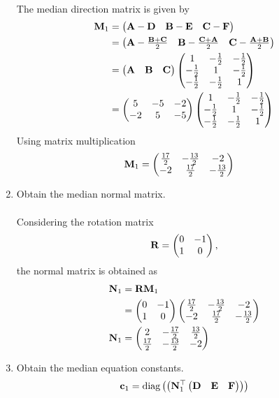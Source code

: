 \documentclass[10pt]{book}
\begin{document}
\begin{enumerate}[label=\thesubsection.\arabic*.,ref=\thesubsection.\theenumi]
\solution \\
The median direction matrix is given by 
\begin{align}
			\mathbf{M}_1 &= \begin{pmatrix}\mathbf{A}-\mathbf{D} & \mathbf{B}-\mathbf{E} & \mathbf{C}-\mathbf{F}\end{pmatrix}
			\\
			&= 
			  \begin{pmatrix}
				  \mathbf{A}-\frac{\mathbf{B}+\mathbf{C}}{2} &
			  \mathbf{B}-\frac{\mathbf{C}+\mathbf{A}}{2} &
			  \mathbf{C}-\frac{\mathbf{A}+\mathbf{B}}{2}\end{pmatrix} 
			  \\
			  &= \begin{pmatrix}\mathbf{A} & \mathbf{B} &\mathbf{C}\end{pmatrix}
			  \begin{pmatrix}
				  1 & -\frac{1}{2} & -\frac{1}{2}
				  \\
				  -\frac{1}{2} & 1 & -\frac{1}{2}
				  \\
				  -\frac{1}{2} & -\frac{1}{2} & 1
				  \end{pmatrix} 
      \\
      &= \begin{pmatrix}5 & -5 & -2 \\ -2 & 5 & -5\end{pmatrix}\begin{pmatrix}
				  1 & -\frac{1}{2} & -\frac{1}{2}
				  \\
				  -\frac{1}{2} & 1 & -\frac{1}{2}
				  \\
				  -\frac{1}{2} & -\frac{1}{2} & 1
				  \end{pmatrix} 
		\end{align}
  Using matrix multiplication 
  \begin{align}
   \mathbf{M}_1 &=   \begin{pmatrix}\frac{17}{2} & -\frac{13}{2} & -2 \\ -2 & \frac{17}{2} & -\frac{13}{2}\end{pmatrix}
  \end{align}
\item Obtain the median normal matrix. \\
\solution \\
Considering the rotation matrix
\begin{align}
\mathbf{R}  = \begin{pmatrix}0 & -1 \\ 1 & 0\end{pmatrix},
\end{align}
the normal matrix is obtained as
\begin{align}
\mathbf{N}_1 &= \mathbf{R}\mathbf{M}_1  \\
&=\begin{pmatrix}0 & -1 \\ 1 & 0\end{pmatrix} \begin{pmatrix}\frac{17}{2} & -\frac{13}{2} & -2 \\ -2 & \frac{17}{2} & -\frac{13}{2}\end{pmatrix} \\
\mathbf{N}_1 &=  \begin{pmatrix} 2 &  -\frac{17}{2} &\frac{13}{2}\\ \frac{17}{2} & -\frac{13}{2} & -2 \end{pmatrix}
\end{align}
\item Obtain the median equation constants.
\begin{align}
\vec{c}_1 &= \text{diag}\brak{\brak{\vec{N}_1^{\top}\myvec{\vec{D} & \vec{E} & \vec{F} }}}  \\

\end{align}
\end{enumerate}
\end{document}
